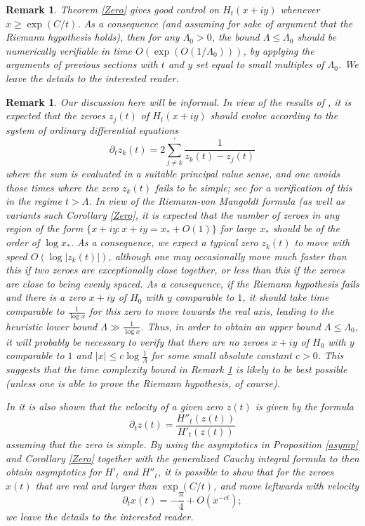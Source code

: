 \documentclass[a4paper,11pt,twoside]{amsart}
\newtheorem{remark}[theorem]{Remark}
\begin{document}
\begin{remark}\label{time-complexity}  Theorem \ref{Zero} gives good control on $H_t(x+iy)$ whenever $x \geq \exp( C/t )$.  As a consequence (and assuming for sake of argument that the Riemann hypothesis holds), then for any $\Lambda_0 > 0$, the bound $\Lambda \leq \Lambda_0$ should be numerically verifiable in time $O( \exp( O(1/\Lambda_0) ))$, by applying the arguments of previous sections with $t$ and $y$ set equal to small multiples of $\Lambda_0$.  We leave the details to the interested reader.
\end{remark}

\begin{remark} Our discussion here will be informal.  In view of the results of \cite{csv}, it is expected that the zeroes $z_j(t)$ of $H_t(x+iy)$ should evolve according to the system of ordinary differential equations
$$ \partial_t z_k(t) = 2 \sum_{j \neq k}^{\prime} \frac{1}{z_k(t) - z_j(t)}$$
where the sum is evaluated in a suitable principal value sense, and one avoids those times where the zero $z_k(t)$ fails to be simple; see \cite[Lemma 2.4]{csv} for a verification of this in the regime $t > \Lambda$.  In view of the Riemann-von Mangoldt formula (as well as variants such Corollary \ref{Zero}, it is expected that the number of zeroes in any region of the form $\{ x+iy: x+iy = x_* + O(1) \}$ for large $x_*$ should be of the order of $\log x_*$.  As a consequence, we expect a typical zero $z_k(t)$ to move with speed $O( \log |z_k(t)| )$, although one may occasionally move much faster than this if two zeroes are exceptionally close together, or less than this if the zeroes are close to being evenly spaced.  As a consequence, if the Riemann hypothesis fails and there is a zero $x+iy$ of $H_0$ with $y$ comparable to $1$, it should take time comparable to $\frac{1}{\log x}$ for this zero to move towards the real axis, leading to the heuristic lower bound $\Lambda \gg \frac{1}{\log x}$.  Thus, in order to obtain an upper bound $\Lambda \leq \Lambda_0$, it will probably be necessary to verify that there are no zeroes $x+iy$ of $H_0$ with $y$ comparable to $1$ and $|x| \leq c \log \frac{1}{\Lambda}$ for some small absolute constant $c>0$.  This suggests that the time complexity bound in Remark \ref{time-complexity} is likely to be best possible (unless one is able to prove the Riemann hypothesis, of course).

In \cite[Lemma 2.1]{csv} it is also shown that the velocity of a given zero $z(t)$ is given by the formula
$$ \partial_t z(t) = \frac{H''_t(z(t))}{H'_t(z(t))}$$
assuming that the zero is simple.  By using the asymptotics in Proposition \ref{asymp} and Corollary \ref{Zero} together with the generalized Cauchy integral formula to then obtain asymptotics for $H'_t$ and $H''_t$, it is possible to show that for the zeroes $x(t)$ that are real and larger than $\exp(C/t)$, and move leftwards with velocity
$$ \partial_t x(t) = - \frac{\pi}{4} + O( x^{-ct} );$$
we leave the details to the interested reader.  


\end{remark}
\end{document}
